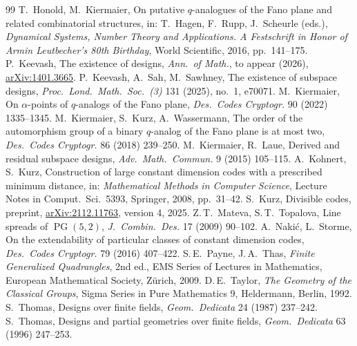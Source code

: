 \documentclass[11pt]{amsart}
\theoremstyle{definition}
\newcommand{\PG}{\operatorname{PG}}
\begin{document}
\begin{thebibliography}{99}
 T.~Honold, M.~Kiermaier, On putative $q$-analogues of the Fano plane and related combinatorial structures, in: T.~Hagen, F.~Rupp, J.~Scheurle (eds.), \emph{Dynamical Systems, Number Theory and Applications. A Festschrift in Honor of Armin Leutbecher's 80th Birthday}, World Scientific, 2016, pp.~141--175.
 P.~Keevash, The existence of designs, \emph{Ann.\ of Math.}, to appear (2026), \href{https://arxiv.org/abs/1401.3665}{arXiv:1401.3665}.
 P.~Keevash, A.~Sah, M.~Sawhney, The existence of subspace designs, \emph{Proc.\ Lond.\ Math.\ Soc.\ (3)} 131 (2025), no.~1, e70071.
 M.~Kiermaier, On $\alpha$-points of $q$-analogs of the Fano plane, \emph{Des.\ Codes Cryptogr.} 90 (2022) 1335--1345.
 M.~Kiermaier, S.~Kurz, A.~Wassermann, The order of the automorphism group of a binary $q$-analog of the Fano plane is at most two, \emph{Des.\ Codes Cryptogr.} 86 (2018) 239--250.
 M.~Kiermaier, R.~Laue, Derived and residual subspace designs, \emph{Adv.\ Math.\ Commun.} 9 (2015) 105--115.
 A.~Kohnert, S.~Kurz, Construction of large constant dimension codes with a prescribed minimum distance, in: \emph{Mathematical Methods in Computer Science}, Lecture Notes in Comput.\ Sci.\ 5393, Springer, 2008, pp.~31--42.
 S.~Kurz, Divisible codes, preprint, \href{https://arxiv.org/abs/2112.11763}{arXiv:2112.11763}, version 4, 2025.
 Z.\,T.~Mateva, S.\,T.~Topalova, Line spreads of $\PG(5,2)$, \emph{J.\ Combin.\ Des.} 17 (2009) 90--102.
 A.~Naki\'c, L.~Storme, On the extendability of particular classes of constant dimension codes, \emph{Des.\ Codes Cryptogr.} 79 (2016) 407--422.
 S.\,E.~Payne, J.\,A.~Thas, \emph{Finite Generalized Quadrangles}, 2nd ed., EMS Series of Lectures in Mathematics, European Mathematical Society, Z\"urich, 2009.
 D.\,E.~Taylor, \emph{The Geometry of the Classical Groups}, Sigma Series in Pure Mathematics 9, Heldermann, Berlin, 1992.
 S.~Thomas, Designs over finite fields, \emph{Geom.\ Dedicata} 24 (1987) 237--242.
 S.~Thomas, Designs and partial geometries over finite fields, \emph{Geom.\ Dedicata} 63 (1996) 247--253.
\end{thebibliography}
\end{document}
